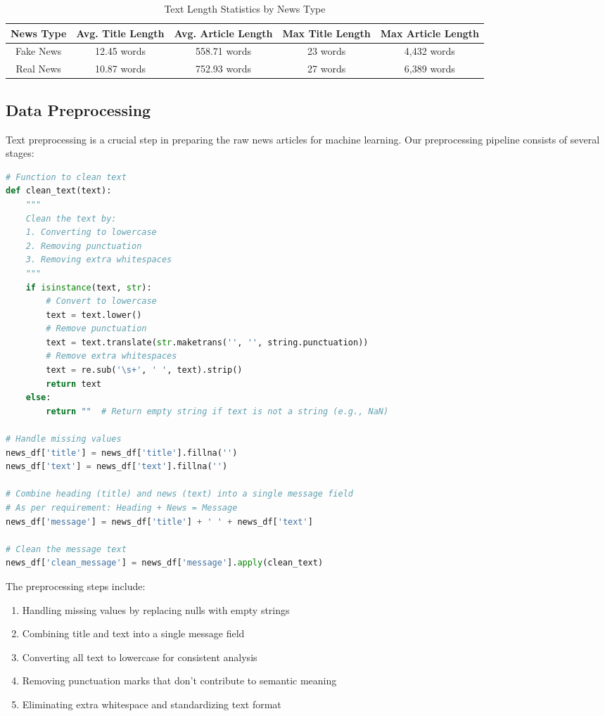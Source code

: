 \documentclass[12pt]{article}
\begin{document}
\begin{table}[h]
\centering
\begin{tabular}{|c|c|c|c|c|}
\hline
\textbf{News Type} & \textbf{Avg. Title Length} & \textbf{Avg. Article Length} & \textbf{Max Title Length} & \textbf{Max Article Length} \\
\hline
Fake News & 12.45 words & 558.71 words & 23 words & 4,432 words \\
\hline
Real News & 10.87 words & 752.93 words & 27 words & 6,389 words \\
\hline
\end{tabular}
\caption{Text Length Statistics by News Type}
\end{table}

\subsection{Data Preprocessing}
Text preprocessing is a crucial step in preparing the raw news articles for machine learning. Our preprocessing pipeline consists of several stages:

\begin{lstlisting}[language=Python, caption=Text Preprocessing Function]
# Function to clean text
def clean_text(text):
    """
    Clean the text by:
    1. Converting to lowercase
    2. Removing punctuation
    3. Removing extra whitespaces
    """
    if isinstance(text, str):
        # Convert to lowercase
        text = text.lower()
        # Remove punctuation
        text = text.translate(str.maketrans('', '', string.punctuation))
        # Remove extra whitespaces
        text = re.sub('\s+', ' ', text).strip()
        return text
    else:
        return ""  # Return empty string if text is not a string (e.g., NaN)

# Handle missing values
news_df['title'] = news_df['title'].fillna('')
news_df['text'] = news_df['text'].fillna('')

# Combine heading (title) and news (text) into a single message field
# As per requirement: Heading + News = Message
news_df['message'] = news_df['title'] + ' ' + news_df['text']

# Clean the message text
news_df['clean_message'] = news_df['message'].apply(clean_text)
\end{lstlisting}

The preprocessing steps include:
\begin{enumerate}
    \item Handling missing values by replacing nulls with empty strings
    \item Combining title and text into a single message field
    \item Converting all text to lowercase for consistent analysis
    \item Removing punctuation marks that don't contribute to semantic meaning
    \item Eliminating extra whitespace and standardizing text format
\end{enumerate}
\end{document}
